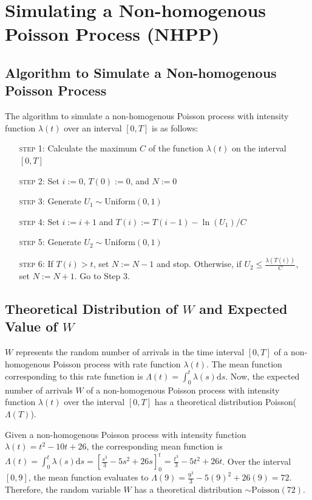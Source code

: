 \documentclass[11pt, oneside]{article}   	%
\begin{document}
\section{Simulating a Non-homogenous Poisson Process (NHPP)}
\subsection{Algorithm to Simulate a Non-homogenous Poisson Process}
The algorithm to simulate a non-homogenous Poisson process with intensity function $\lambda(t)$ over an interval $[0,T]$ is as follows:
\begin{enumerate}[leftmargin=30pt,labelindent=65pt,itemindent=30pt]
\item[\textsc{step 1:}] Calculate the maximum $C$ of the function $\lambda(t)$ on the interval $[0,T]$
\item[\textsc{step 2:}] Set $i:=0$, $T(0):=0$, and $N:=0$
\item[\textsc{step 3:}] Generate $U_1 \sim \text{Uniform}(0,1)$
\item[\textsc{step 4:}] Set $i:=i+1$ and $T(i) := T(i-1) - \ln(U_1)/C$
\item[\textsc{step 5:}] Generate $U_2 \sim\text{Uniform}(0,1)$
\item[\textsc{step 6:}] If $T(i) > t$, set $N:=N-1$ and stop. Otherwise, if $U_2 \leq \frac{\lambda(T(i))}{C}$, set $N:=N+1$. Go to Step 3.
\end{enumerate}

\subsection{Theoretical Distribution of $W$ and Expected Value of $W$}
$W$ represents the random number of arrivals in the time interval $[0, T]$ of a non-homogenous Poisson process with rate function $\lambda(t)$. The mean function corresponding to this rate function is $\Lambda(t) = \int_{0}^{t}\lambda(s)\mathrm{d}s $. Now, the expected number of arrivals $W$ of a non-homogenous Poisson process with intensity function $\lambda(t)$ over the interval $[0, T]$ has a theoretical distribution Poisson($\Lambda(T)$). 

Given a non-homogenous Poisson process with intensity function $\lambda(t)=t^2-10t+26$, the corresponding mean function is $\Lambda(t)=\int_{0}^{t}\lambda(s)\mathrm{d}s=\left[\frac{s^3}{3} - 5s^2 + 26s\right]_{0}^{t} =\frac{t^3}{3}-5t^2+26t$. Over the interval $[0,9]$, the mean function evaluates to $\Lambda(9)=\frac{9^3}{3} - 5(9)^2+26(9) = 72$. Therefore, the random variable $W$ has a theoretical distribution $\sim \text{Poisson}(72)$.
\end{document}
